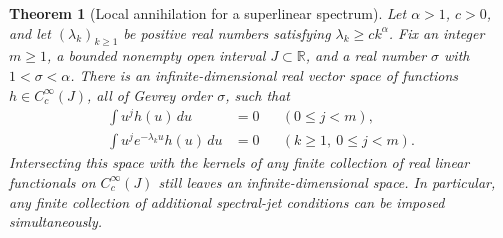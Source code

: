 \documentclass[11pt]{article}
\newtheorem{theorem}{Theorem}[section]
\theoremstyle{definition}
\theoremstyle{remark}
\numberwithin{equation}{section}
\begin{document}
\begin{theorem}[Local annihilation for a superlinear spectrum]
\label{spec:sparse}
Let $\alpha>1$, $c>0$, and let $(\lambda_k)_{k\ge1}$ be positive real
numbers satisfying $\lambda_k\ge c k^\alpha$. Fix an integer $m\ge1$,
a bounded nonempty open interval $J\subset\mathbb R$, and a real number
$\sigma$ with $1<\sigma<\alpha$. There is an infinite-dimensional
real vector space of functions $h\in C_c^\infty(J)$, all of Gevrey
order $\sigma$, such that
\begin{align}
 \int u^j h(u)\,du&=0 &&(0\le j<m),\label{spec:zero-moments}\\
 \int u^j e^{-\lambda_k u}h(u)\,du&=0
       &&(k\ge1,\ 0\le j<m).\label{spec:exponential-moments}
\end{align}
Intersecting this space with the kernels of any finite collection of
real linear functionals on $C_c^\infty(J)$ still leaves an
infinite-dimensional space. In particular, any finite collection of
additional spectral-jet conditions can be imposed simultaneously.
\end{theorem}
\end{document}
